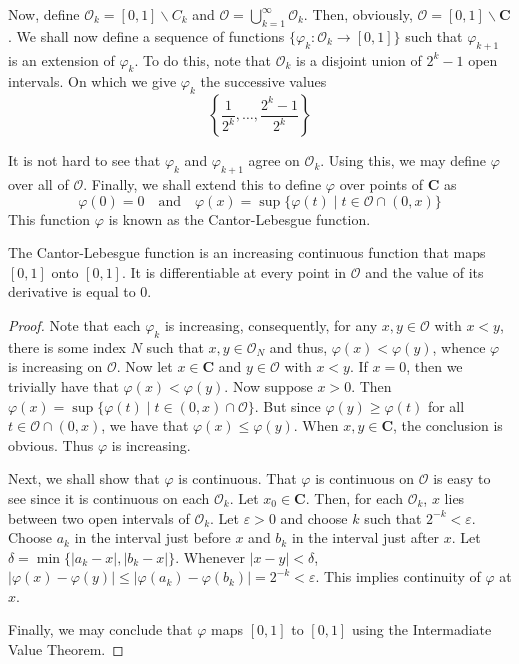 Now, define $\mathcal O_k = [0,1]\backslash C_k$ and $\mathcal O = \bigcup_{k = 1}^\infty\mathcal O_k$. Then, obviously, $\mathcal O = [0,1]\backslash\mathbf C$.
We shall now define a sequence of functions $\{\varphi_k:\mathcal O_k\to[0,1]\}$ such that $\varphi_{k + 1}$ is an extension of $\varphi_k$. To do this, note that $\mathcal O_k$ is a disjoint union of $2^{k} - 1$ open intervals. On which we give $\varphi_k$ the successive values
\begin{equation*}
    \left\{\frac{1}{2^k},\ldots,\frac{2^k - 1}{2^k}\right\}
\end{equation*}

It is not hard to see that $\varphi_k$ and $\varphi_{k + 1}$ agree on $\mathcal{O}_k$. Using this, we may define $\varphi$ over all of $\mathcal O$. Finally, we shall extend this to define $\varphi$ over points of $\mathbf C$ as 
\begin{equation*}
    \varphi(0) = 0\quad\text{and}\quad\varphi(x) = \sup\{\varphi(t)\mid t\in\mathcal O\cap(0,x)\}
\end{equation*}
This function $\varphi$ is known as the Cantor-Lebesgue function.

\begin{proposition}
    The Cantor-Lebesgue function is an increasing continuous function that maps $[0,1]$ onto $[0,1]$. It is differentiable at every point in $\mathcal O$ and the value of its derivative is equal to $0$.
\end{proposition}
\begin{proof}
    Note that each $\varphi_k$ is increasing, consequently, for any $x,y\in\mathcal O$ with $x < y$, there is some index $N$ such that $x,y\in\mathcal O_N$ and thus, $\varphi(x) < \varphi(y)$, whence $\varphi$ is increasing on $\mathcal O$. Now let $x\in\mathbf C$ and $y\in\mathcal O$ with $x < y$. If $x = 0$, then we trivially have that $\varphi(x) < \varphi(y)$. Now suppose $x > 0$. Then $\varphi(x) = \sup\{\varphi(t)\mid t\in(0,x)\cap\mathcal O\}$. But since $\varphi(y)\ge\varphi(t)$ for all $t\in\mathcal O\cap(0,x)$, we have that $\varphi(x)\le\varphi(y)$. When $x,y\in\mathbf C$, the conclusion is obvious. Thus $\varphi$ is increasing.

    Next, we shall show that $\varphi$ is continuous. That $\varphi$ is continuous on $\mathcal O$ is easy to see since it is continuous on each $\mathcal O_k$. Let $x_0\in\mathbf C$. Then, for each $\mathcal O_k$, $x$ lies between two open intervals of $\mathcal O_k$. Let $\varepsilon > 0$ and choose $k$ such that $2^{-k} < \varepsilon$. Choose $a_k$ in the interval just before $x$ and $b_k$ in the interval just after $x$. Let $\delta = \min\{|a_k - x|, |b_k - x|\}$. Whenever $|x - y| < \delta$, $|\varphi(x) - \varphi(y)|\le|\varphi(a_k) - \varphi(b_k)| = 2^{-k} < \varepsilon$. This implies continuity of $\varphi$ at $x$.

    Finally, we may conclude that $\varphi$ maps $[0,1]$ to $[0,1]$ using the Intermadiate Value Theorem.
\end{proof}

